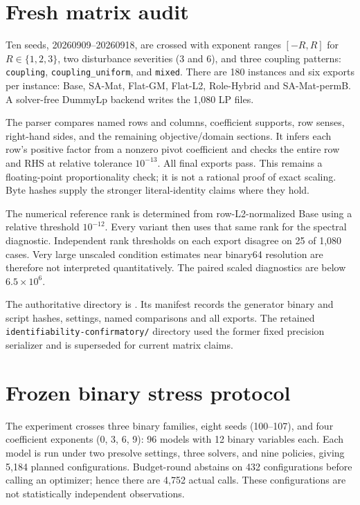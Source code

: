 \documentclass[11pt]{article}
\begin{document}
\section{Fresh matrix audit}
Ten seeds, 20260909--20260918, are crossed with exponent ranges $[-R,R]$ for
$R\in\{1,2,3\}$, two disturbance severities (3 and 6), and three coupling patterns:
\texttt{coupling}, \texttt{coupling\_uniform}, and \texttt{mixed}. There are 180
instances and six exports per instance: Base, SA-Mat, Flat-GM, Flat-L2, Role-Hybrid
and SA-Mat-permB. A solver-free DummyLp backend writes the 1,080 LP files.

The parser compares named rows and columns, coefficient supports, row senses,
right-hand sides, and the remaining objective/domain sections. It infers each row's
positive factor from a nonzero pivot coefficient and checks the entire row and RHS
at relative tolerance $10^{-13}$. All final exports pass. This remains a
floating-point proportionality check; it is not a rational proof of exact scaling.
Byte hashes supply the stronger literal-identity claims where they hold.

The numerical reference rank is determined from row-L2-normalized Base using a
relative threshold $10^{-12}$. Every variant then uses that same rank for the
spectral diagnostic. Independent rank thresholds on each export disagree on 25 of
1,080 cases. Very large unscaled condition estimates near binary64 resolution are
therefore not interpreted quantitatively. The paired scaled diagnostics are below
$6.5\times10^6$.

The authoritative directory is
. Its manifest records
the generator binary and script hashes, settings, named comparisons and all exports.
The retained \texttt{identifiability-confirmatory/} directory used the former fixed
precision serializer and is superseded for current matrix claims.

\section{Frozen binary stress protocol}
The experiment crosses three binary families, eight seeds (100--107), and four
coefficient exponents (0, 3, 6, 9): 96 models with 12 binary variables each. Each
model is run under two presolve settings, three solvers, and nine policies, giving
5,184 planned configurations. Budget-round abstains on 432 configurations before
calling an optimizer; hence there are 4,752 actual calls. These configurations are
not statistically independent observations.
\end{document}
